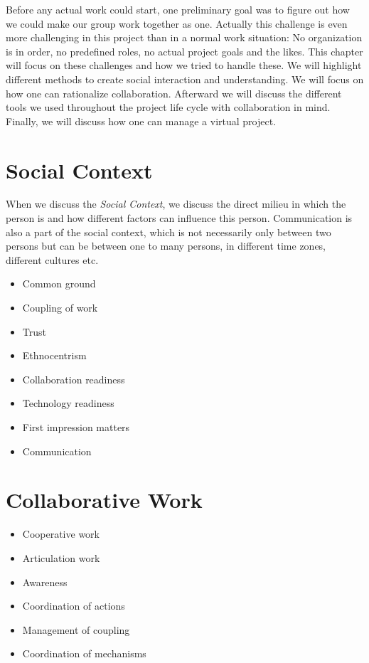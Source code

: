 Before any actual work could start, one preliminary goal was to figure out how we could make our group work together as one. Actually this challenge is even more challenging in this project than in a normal work situation: No organization is in order, no predefined roles, no actual project goals and the likes. This chapter will focus on these challenges and how we tried to handle these. We will highlight different methods to create social interaction and understanding. We will focus on how one can rationalize collaboration. Afterward we will discuss the different tools we used throughout the project life cycle with collaboration in mind. Finally, we will discuss how one can manage a virtual project.

\section{Social Context}
When we discuss the \textit{Social Context}, we discuss the direct milieu in which the person is and how different factors can influence this person. Communication is also a part of the social context, which is not necessarily only between two persons but can be between one to many persons, in different time zones, different cultures etc. 
\begin{itemize}
  \item Common ground
  \item Coupling of work
  \item Trust
	\item Ethnocentrism
	\item Collaboration readiness
	\item Technology readiness
	\item First impression matters
	\item Communication
\end{itemize}

\section{Collaborative Work}
\begin{itemize}
  \item Cooperative work
  \item Articulation work
  \item Awareness
	\item Coordination of actions
	\item Management of coupling
	\item Coordination of mechanisms
\end{itemize}

